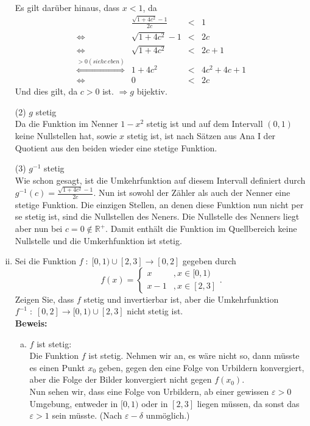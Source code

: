 \begin{enumerate}[(i)]
		Es gilt darüber hinaus, dass $x < 1$, da
		$$\begin{array}{crcl}
			& \frac{\sqrt{1+4c^2} -1}{2c} &<& 1\\
			\Leftrightarrow & \sqrt{1+4c^2} -1 &<& 2c\\
			\Leftrightarrow & \sqrt{1+4c^2} &<& 2c +1\\
			\stackrel{>0 (siehe \, eben)}\Leftrightarrow &
				 1 + 4c^2 &<& 4c^2 + 4c + 1\\
			\Leftrightarrow & 0 & < & 2c
		\end{array}$$
		Und dies gilt, da $c > 0$ ist.
                $\Rightarrow g$ bijektiv. \\

\pagebreak

        (2) $g$ stetig \\
            Da die Funktion im Nenner $1-x^2$ stetig ist und auf dem Intervall $(0,1)$ keine Nullstellen hat, sowie $x$ stetig ist,
	ist nach Sätzen aus Ana I der Quotient aus den beiden wieder eine stetige Funktion.

        (3) $g^{-1}$ stetig\\
            Wie schon gesagt, ist die Umkehrfunktion auf diesem Intervall definiert durch $g^{-1}(c) = \frac{\sqrt{1+4c^2}-1}{2c}$.
	Nun ist sowohl der Zähler als auch der Nenner eine stetige Funktion. Die einzigen Stellen, an denen diese Funktion nun nicht per
	se stetig ist, sind die Nullstellen des Neners. Die Nullstelle des Nenners liegt aber nun bei $c = 0 \not\in \mathbb{R}^+$. Damit
	enthält die Funktion im Quellbereich keine Nullstelle und die Umkerhfunktion ist stetig.
    
    \item Sei die Funktion $f \; : \; [0,1) \cup [2,3] \rightarrow [0,2]$ gegeben durch
        $$
            f(x) = \left\{ \begin{array}{lr}
                x &, x\in [0,1)\\
                x-1 &, x \in [2,3]
            \end{array} \right. .
        $$
        Zeigen Sie, dass $f$ stetig und invertierbar ist, aber die Umkehrfunktion 
        $f^{-1} \; : \; [0,2] \rightarrow [0,1) \cup [2,3]$ nicht stetig ist.\\

    \textbf{Beweis:}\\
        \begin{enumerate}[a)]
		\item $f$ ist stetig:\\
			Die Funktion $f$ ist stetig. Nehmen wir an, es wäre nicht so, dann müsste es einen Punkt
			$x_0$ geben, gegen den eine Folge von Urbildern konvergiert, aber die Folge der Bilder konvergiert
			nicht gegen $f(x_0)$.\\
			Nun sehen wir, dass eine Folge von Urbildern, ab einer gewissen $\varepsilon >0$ Umgebung, entweder in
			$[0,1)$ oder in $[2,3]$ liegen müssen, da sonst das $\varepsilon > 1$ sein müsste. (Nach $\varepsilon-\delta$ unmöglich.)\\


\end{enumerate}
\end{enumerate}
